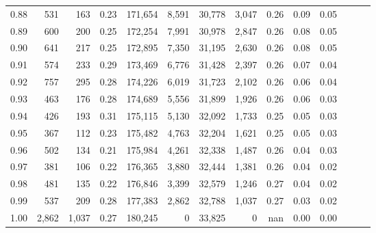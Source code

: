 \begin{tabular}{rrrrrrrrrrrrrr}
0.88 &     531 &    163 &  0.23 &  171,654 &    8,591 &  30,778 &   3,047 &  0.26 &  0.09 &      0.05 \\
0.89 &     600 &    200 &  0.25 &  172,254 &    7,991 &  30,978 &   2,847 &  0.26 &  0.08 &      0.05 \\
0.90 &     641 &    217 &  0.25 &  172,895 &    7,350 &  31,195 &   2,630 &  0.26 &  0.08 &      0.05 \\
0.91 &     574 &    233 &  0.29 &  173,469 &    6,776 &  31,428 &   2,397 &  0.26 &  0.07 &      0.04 \\
0.92 &     757 &    295 &  0.28 &  174,226 &    6,019 &  31,723 &   2,102 &  0.26 &  0.06 &      0.04 \\
0.93 &     463 &    176 &  0.28 &  174,689 &    5,556 &  31,899 &   1,926 &  0.26 &  0.06 &      0.03 \\
0.94 &     426 &    193 &  0.31 &  175,115 &    5,130 &  32,092 &   1,733 &  0.25 &  0.05 &      0.03 \\
0.95 &     367 &    112 &  0.23 &  175,482 &    4,763 &  32,204 &   1,621 &  0.25 &  0.05 &      0.03 \\
0.96 &     502 &    134 &  0.21 &  175,984 &    4,261 &  32,338 &   1,487 &  0.26 &  0.04 &      0.03 \\
0.97 &     381 &    106 &  0.22 &  176,365 &    3,880 &  32,444 &   1,381 &  0.26 &  0.04 &      0.02 \\
0.98 &     481 &    135 &  0.22 &  176,846 &    3,399 &  32,579 &   1,246 &  0.27 &  0.04 &      0.02 \\
0.99 &     537 &    209 &  0.28 &  177,383 &    2,862 &  32,788 &   1,037 &  0.27 &  0.03 &      0.02 \\
1.00 &   2,862 &  1,037 &  0.27 &  180,245 &        0 &  33,825 &       0 &   nan &  0.00 &      0.00 \\
\bottomrule
\end{tabular}
